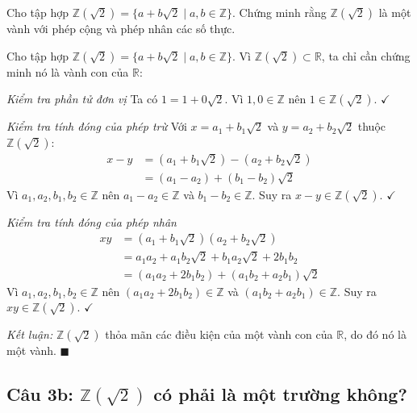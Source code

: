 \begin{questionbox}
Cho tập hợp $\mathbb{Z}(\sqrt{2}) = \{a + b\sqrt{2} \mid a, b \in \mathbb{Z}\}$. Chứng minh rằng $\mathbb{Z}(\sqrt{2})$ là một vành với phép cộng và phép nhân các số thực.
\end{questionbox}

\begin{solution}
Cho tập hợp $\mathbb{Z}(\sqrt{2}) = \{a + b\sqrt{2} \mid a, b \in \mathbb{Z}\}$. Vì $\mathbb{Z}(\sqrt{2}) \subset \mathbb{R}$, ta chỉ cần chứng minh nó là vành con của $\mathbb{R}$:

\textit{Kiểm tra phần tử đơn vị}
Ta có $1 = 1 + 0\sqrt{2}$. Vì $1, 0 \in \mathbb{Z}$ nên $1 \in \mathbb{Z}(\sqrt{2})$. $\checkmark$

\textit{Kiểm tra tính đóng của phép trừ}
Với $x = a_1 + b_1\sqrt{2}$ và $y = a_2 + b_2\sqrt{2}$ thuộc $\mathbb{Z}(\sqrt{2})$:
\begin{align*}
    x - y &= (a_1 + b_1\sqrt{2}) - (a_2 + b_2\sqrt{2}) \\
    &= (a_1 - a_2) + (b_1 - b_2)\sqrt{2}
\end{align*}
Vì $a_1, a_2, b_1, b_2 \in \mathbb{Z}$ nên $a_1 - a_2 \in \mathbb{Z}$ và $b_1 - b_2 \in \mathbb{Z}$.
Suy ra $x - y \in \mathbb{Z}(\sqrt{2})$. $\checkmark$

\textit{Kiểm tra tính đóng của phép nhân}
\begin{align*}
    xy &= (a_1 + b_1\sqrt{2})(a_2 + b_2\sqrt{2}) \\
    &= a_1a_2 + a_1b_2\sqrt{2} + b_1a_2\sqrt{2} + 2b_1b_2 \\
    &= (a_1a_2 + 2b_1b_2) + (a_1b_2 + a_2b_1)\sqrt{2}
\end{align*}
Vì $a_1, a_2, b_1, b_2 \in \mathbb{Z}$ nên $(a_1a_2 + 2b_1b_2) \in \mathbb{Z}$ và $(a_1b_2 + a_2b_1) \in \mathbb{Z}$.
Suy ra $xy \in \mathbb{Z}(\sqrt{2})$. $\checkmark$

\textit{Kết luận:} $\mathbb{Z}(\sqrt{2})$ thỏa mãn các điều kiện của một vành con của $\mathbb{R}$, do đó nó là một vành. $\blacksquare$
\end{solution}

\subsection*{Câu 3b: $\mathbb{Z}(\sqrt{2})$ có phải là một trường không?}


